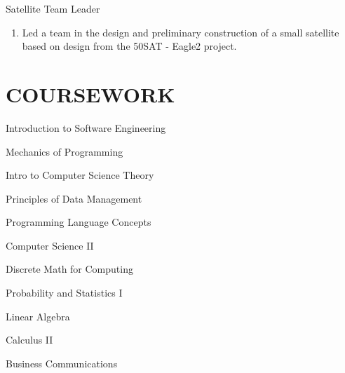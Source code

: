 \documentclass[line, margin]{res}
\begin{document}
\begin{resume}
 Satellite Team Leader
      \begin{enumerate}[series=MyList, label=\textbullet]
        \item Led a team in the design and preliminary construction of a small satellite based on design from the \textdollar 50SAT - Eagle2 project.
      \end{enumerate}

\section{COURSEWORK}


      \begin{enumerate*}[series=MyList, before=\hspace{-0.6ex}, label=\textbullet]
        \item Introduction to Software Engineering
        \item Mechanics of Programming
        \item Intro to Computer Science Theory
        \item Principles of Data Management
        \item Programming Language Concepts
        \item Computer Science II
        \item Discrete Math for Computing
        \item Probability and Statistics I
        \item Linear Algebra
        \item Calculus II
        \item Business Communications
      \end{enumerate*}


 
\end{resume}
\end{document}
